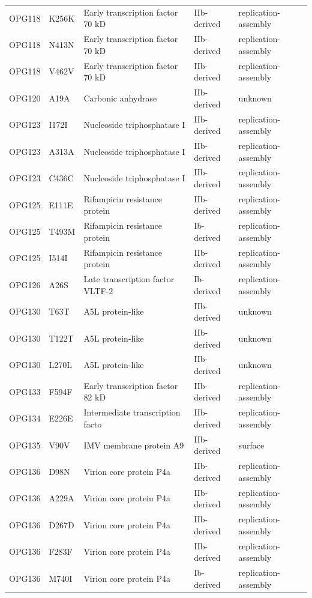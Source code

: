 \documentclass[11pt]{article}
\begin{document}
\begin{longtable}{lllll}
OPG118 & K256K & Early transcription factor 70 kD & IIb-derived & replication-assembly \\
OPG118 & N413N & Early transcription factor 70 kD & IIb-derived & replication-assembly \\
OPG118 & V462V & Early transcription factor 70 kD & IIb-derived & replication-assembly \\
OPG120 & A19A & Carbonic anhydrase & IIb-derived & unknown \\
OPG123 & I172I & Nucleoside triphosphatase I & IIb-derived & replication-assembly \\
OPG123 & A313A & Nucleoside triphosphatase I & IIb-derived & replication-assembly \\
OPG123 & C436C & Nucleoside triphosphatase I & IIb-derived & replication-assembly \\
OPG125 & E111E & Rifampicin resistance protein & IIb-derived & replication-assembly \\
OPG125 & T493M & Rifampicin resistance protein & Ib-derived & replication-assembly \\
OPG125 & I514I & Rifampicin resistance protein & IIb-derived & replication-assembly \\
OPG126 & A26S & Late transcription factor VLTF-2 & Ib-derived & replication-assembly \\
OPG130 & T63T & A5L protein-like & IIb-derived & unknown \\
OPG130 & T122T & A5L protein-like & IIb-derived & unknown \\
OPG130 & L270L & A5L protein-like & IIb-derived & unknown \\
OPG133 & F594F & Early transcription factor 82 kD & IIb-derived & replication-assembly \\
OPG134 & E226E & Intermediate transcription facto & IIb-derived & replication-assembly \\
OPG135 & V90V & IMV membrane protein A9 & IIb-derived & surface \\
OPG136 & D98N & Virion core protein P4a & IIb-derived & replication-assembly \\
OPG136 & A229A & Virion core protein P4a & IIb-derived & replication-assembly \\
OPG136 & D267D & Virion core protein P4a & IIb-derived & replication-assembly \\
OPG136 & F283F & Virion core protein P4a & IIb-derived & replication-assembly \\
OPG136 & M740I & Virion core protein P4a & Ib-derived & replication-assembly \\

\end{longtable}
\end{document}
